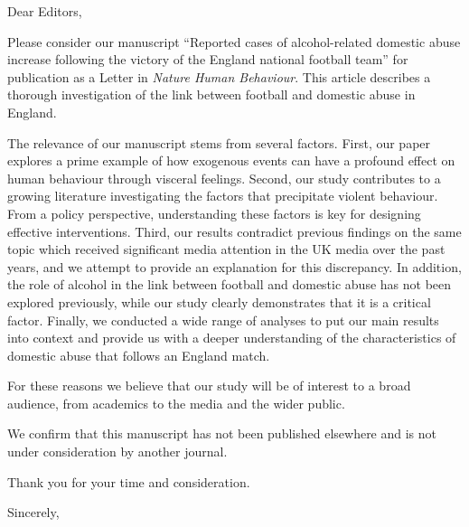 \documentclass{letter}
\begin{document}
\begin{letter}
{}
\opening{Dear Editors,} %

Please consider our manuscript ``Reported cases of alcohol-related domestic abuse increase following the victory of the England national football team'' for publication as a Letter in \textit{Nature Human Behaviour}. This article describes a thorough investigation of the link between football and domestic abuse in England.

The relevance of our manuscript stems from several factors. First, our paper explores a prime example of how exogenous events can have a profound effect on human behaviour through visceral feelings. Second, our study contributes to a growing literature investigating the factors that precipitate violent behaviour. From a policy perspective, understanding these factors is key for designing effective interventions. Third, our results contradict previous findings on the same topic which received significant media attention in the UK media over the past years, and we attempt to provide an explanation for this discrepancy. In addition, the role of alcohol in the link between football and domestic abuse has not been explored previously, while our study clearly demonstrates that it is a critical factor. Finally, we conducted a wide range of analyses to put our main results into context and provide us with a deeper understanding of the characteristics of domestic abuse that follows an England match.

For these reasons we believe that our study will be of interest to a broad audience, from academics to the media and the wider public.

We confirm that this manuscript has not been published elsewhere and is not under consideration by another journal.

Thank you for your time and consideration.

\closing{Sincerely,}



\end{letter}
\end{document}
